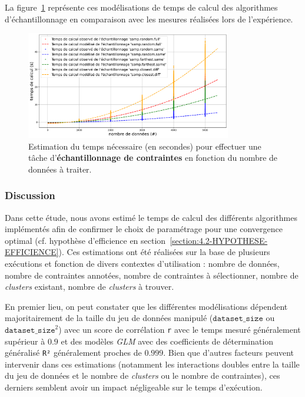 			La figure~\ref{figure:4.3.2-ETUDE-COUTS-TEMPS-CALCUL-MODELISATION-SAMPLING} représente ces modélisations de temps de calcul des algorithmes d'échantillonnage en comparaison avec les mesures réalisées lors de l'expérience.
			\newline
			\begin{figure}[!htb]
				\centering
				\includegraphics[width=0.8\textwidth]{figures/etude-temps-calcul-modelisation-4samp}
				\caption{Estimation du temps nécessaire (en secondes) pour effectuer une tâche d'\textbf{échantillonnage de contraintes} en fonction du nombre de données à traiter.}
				\label{figure:4.3.2-ETUDE-COUTS-TEMPS-CALCUL-MODELISATION-SAMPLING}
			\end{figure}

		\subsubsection{Discussion}
		
			Dans cette étude, nous avons estimé le temps de calcul des différents algorithmes implémentés afin de confirmer le choix de paramétrage pour une convergence optimal (cf. hypothèse d'efficience en section~\ref{section:4.2-HYPOTHESE-EFFICIENCE}).
			Ces estimations ont été réalisées sur la base de plusieurs exécutions et fonction de divers contextes d'utilisation : nombre de données, nombre de contraintes annotées, nombre de contraintes à sélectionner, nombre de \textit{clusters} existant, nombre de \textit{clusters} à trouver.
			
			En premier lieu, on peut constater que les différentes modélisations dépendent majoritairement de la taille du jeu de données manipulé ($\texttt{dataset\_size}$ ou $\texttt{dataset\_size}^{2}$) avec un score de corrélation \texttt{r} avec le temps mesuré généralement supérieur à $0.9$ et des modèles \textit{GLM} avec des coefficients de détermination généralisé \texttt{R²} généralement proches de $0.999$.
			Bien que d'autres facteurs peuvent intervenir dans ces estimations (notamment les interactions doubles entre la taille du jeu de données et le nombre de \textit{clusters} ou le nombre de contraintes), ces derniers semblent avoir un impact négligeable sur le temps d'exécution.
			
